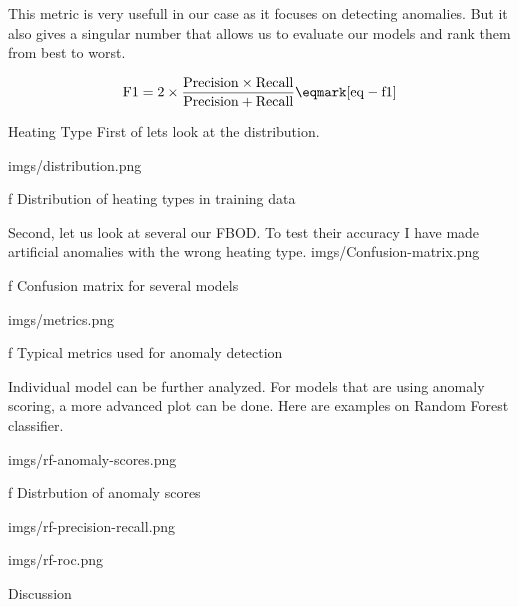 This metric is very usefull in our case as it focuses on detecting anomalies. But it also gives a singular number that allows us to evaluate our models and rank them from best to worst.

$$\rm
{F1} = 2 \times { Precision \times Recall \over Precision + Recall} \eqmark[eq-f1]
$$


\sec Heating Type
First of lets look at the distribution.

\medskip
{}
\picw=15cm \cinspic imgs/distribution.png
\caption/f Distribution of heating types in training data
\medskip


Second, let us look at several our FBOD. To test their accuracy I have made artificial anomalies with the wrong heating type.
\medskip
{}
\picw=15cm \cinspic imgs/Confusion-matrix.png
\caption/f Confusion matrix for several models
\medskip

\medskip
{}
\picw=15cm \cinspic imgs/metrics.png
\caption/f Typical metrics used for anomaly detection
\medskip

\secc Individual model can be further analyzed.
For models that are using anomaly scoring, a more advanced plot can be done. Here are examples on Random Forest classifier.

\medskip
\picw=15cm \cinspic imgs/rf-anomaly-scores.png
\caption/f Distrbution of anomaly scores
\medskip


\medskip
\picw=10cm \cinspic imgs/rf-precision-recall.png
\medskip

\medskip
\picw=10cm \cinspic imgs/rf-roc.png
\medskip

\sec Discussion